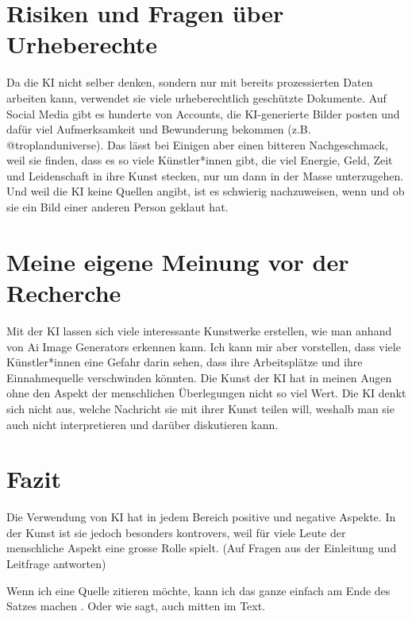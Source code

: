 \documentclass{article}
\begin{document}
\section{Risiken und Fragen über Urheberechte}
    Da die KI nicht selber denken, sondern nur mit bereits prozessierten Daten arbeiten kann, verwendet sie viele urheberechtlich geschützte Dokumente. Auf Social Media gibt es hunderte von Accounts, die KI-generierte Bilder posten und dafür viel Aufmerksamkeit und Bewunderung bekommen (z.B. @troplanduniverse). Das lässt bei Einigen aber einen bitteren Nachgeschmack, weil sie finden, dass es so viele Künstler*innen gibt, die viel Energie, Geld, Zeit und Leidenschaft in ihre Kunst stecken, nur um dann in der Masse unterzugehen. Und weil die KI keine Quellen angibt, ist es schwierig nachzuweisen, wenn und ob sie ein Bild einer anderen Person geklaut hat. 

\section{Meine eigene Meinung vor der Recherche}
    Mit der KI lassen sich viele interessante Kunstwerke erstellen, wie man anhand von Ai Image 
    Generators erkennen kann. Ich kann mir aber vorstellen, dass viele Künstler*innen eine Gefahr 
    darin sehen, dass ihre Arbeitsplätze und ihre Einnahmequelle verschwinden könnten. Die Kunst der KI 
    hat in meinen Augen ohne den Aspekt der menschlichen Überlegungen nicht so viel Wert. Die KI denkt 
    sich nicht aus, welche Nachricht sie mit ihrer Kunst teilen will, weshalb man sie auch nicht 
    interpretieren und darüber diskutieren kann.

\section{Fazit}
    Die Verwendung von KI hat in jedem Bereich positive und negative Aspekte. In der Kunst ist sie jedoch 
    besonders kontrovers, weil für viele Leute der menschliche Aspekt eine grosse Rolle spielt.
    (Auf Fragen aus der Einleitung und Leitfrage antworten)

Wenn ich eine Quelle zitieren möchte, kann ich das ganze einfach am Ende des Satzes machen \citep{example}. Oder wie \citet{example} sagt, auch mitten im Text.

\printbibliography
\end{document}
